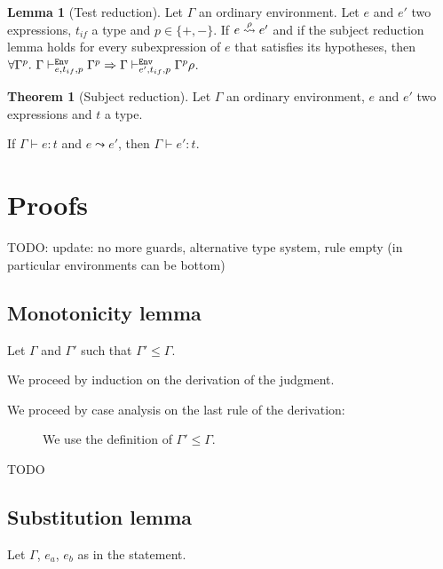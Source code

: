 \documentclass[a4paper]{article}
\theoremstyle{definition}
\newtheorem{theorem}{Theorem}
\newtheorem{lemma}{Lemma}
\begin{document}
        \begin{lemma}[Test reduction]
          Let $\Gamma$ an ordinary environment. Let $e$ and $e'$ two expressions, $t_{if}$ a type and $p \in \{+,-\}$.
          If $e \xleadsto{\rho} e'$ and if the subject reduction lemma holds for every subexpression of $e$ that satisfies its hypotheses,
          then $\forall \Gamma^p.\ \Gamma \evdash p e {t_{if}} \Gamma^p \Rightarrow \Gamma \evdash p {e'} {t_{if}} \Gamma^p\rho$.
        \end{lemma}

        \begin{theorem}[Subject reduction]
          Let $\Gamma$ an ordinary environment, $e$ and $e'$ two expressions and $t$ a type.

          If $\Gamma\vdash e:t$ and $e\leadsto e'$, then $\Gamma\vdash e':t$.
        \end{theorem}

        \section{Proofs}

        TODO: update: no more guards, alternative type system, rule empty (in particular environments can be bottom)

        \subsection{Monotonicity lemma}

        Let $\Gamma$ and $\Gamma'$ such that $\Gamma' \leq \Gamma$.

        We proceed by induction on the derivation of the judgment.

        We proceed by case analysis on the last rule of the derivation:
        
        \begin{description}
          \item[] We use the definition of $\Gamma' \leq \Gamma$.
          \item[TODO] 
        \end{description}

        \subsection{Substitution lemma}

        Let $\Gamma$, $e_a$, $e_b$ as in the statement.
\end{document}

